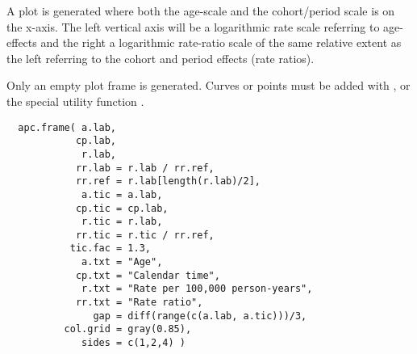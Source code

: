 \begin{Description}\relax
A plot is generated where both the age-scale and the cohort/period
scale is on the x-axis. The left vertical axis will be a logarithmic
rate scale referring to age-effects and the right a logarithmic
rate-ratio scale of the same relative extent as the left referring to
the cohort and period effects (rate ratios).

Only an empty plot frame is generated. Curves or points must be added
with ,  or the special utility function
.
\end{Description}
\begin{Usage}
\begin{verbatim}
  apc.frame( a.lab,
            cp.lab,
             r.lab,
            rr.lab = r.lab / rr.ref,
            rr.ref = r.lab[length(r.lab)/2],
             a.tic = a.lab,
            cp.tic = cp.lab,
             r.tic = r.lab,
            rr.tic = r.tic / rr.ref,
           tic.fac = 1.3,
             a.txt = "Age",
            cp.txt = "Calendar time",
             r.txt = "Rate per 100,000 person-years",
            rr.txt = "Rate ratio",
               gap = diff(range(c(a.lab, a.tic)))/3,
          col.grid = gray(0.85),
             sides = c(1,2,4) )
\end{verbatim}
\end{Usage}
